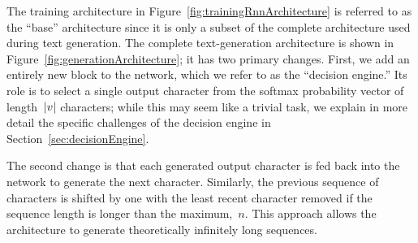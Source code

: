 \documentclass{article}
\DeclarePairedDelimiter\abs{\lvert}{\rvert}%
\begin{document}
The training architecture in Figure~\ref{fig:trainingRnnArchitecture} is referred to as the ``base'' architecture since it is only a subset of the complete architecture used during text generation.  The complete text-generation architecture is shown in Figure~\ref{fig:generationArchitecture}; it has two primary changes.  First, we add an entirely new block to the network, which we refer to as the ``decision engine.''  Its role is to select a single output character from the softmax probability vector of length~$\abs*{v}$ characters; while this may seem like a trivial task, we explain in more detail the specific challenges of the decision engine in Section~\ref{sec:decisionEngine}. 

The second change is that each generated output character is fed back into the network to generate the next character.  Similarly, the previous sequence of characters is shifted by one with the least recent character removed if the sequence length is longer than the maximum,~$n$.  This approach allows the architecture to generate theoretically infinitely long sequences.
\end{document}
